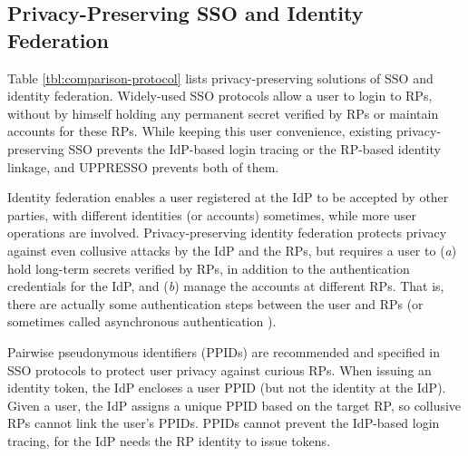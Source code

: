 

\subsection{Privacy-Preserving SSO and Identity Federation}
\label{subsec-solutions}
Table \ref{tbl:comparison-protocol} lists privacy-preserving solutions of SSO and identity federation.
Widely-used SSO protocols \cite{OpenIDConnect,rfc6749,SAML,SAMLIdentifier} allow a user to login to RPs,
        without by himself holding any permanent secret verified by RPs
        or maintain accounts for these RPs.
While keeping this user convenience,
 existing privacy-preserving SSO \cite{BrowserID,SPRESSO,NIST2017draft} prevents the IdP-based login tracing or the RP-based identity linkage,
    and UPPRESSO prevents both of them.

Identity federation enables a user registered at the IdP to be accepted by other parties,
            with different identities (or accounts) sometimes,
        while more user operations are involved.
Privacy-preserving identity federation \cite{ELPASSO,UnlimitID,hyperledge-idemix,PseudoID,Opaak}
    protects privacy against even collusive attacks by the IdP and the RPs,
    but requires a user to (\emph{a}) hold long-term secrets verified by RPs,
            in addition to the authentication credentials for the IdP,
                and (\emph{b}) manage the accounts at different RPs.
That is, there are actually some authentication steps between the user and RPs (or sometimes called asynchronous authentication \cite{ELPASSO}).


Pairwise pseudonymous identifiers (PPIDs) are recommended \cite{NIST2017draft}
 and specified in SSO protocols \cite{OpenIDConnect, SAMLIdentifier} to protect user privacy against curious RPs.
When issuing an identity token,
        the IdP encloses a user PPID (but not the identity at the IdP).
Given a user,
    the IdP assigns a unique PPID based on the target RP,
    so collusive RPs cannot link the user's PPIDs.
PPIDs cannot prevent the IdP-based login tracing,
 for the IdP needs the RP identity to issue tokens.



